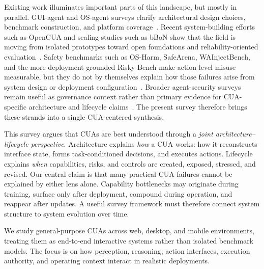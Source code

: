 Existing work illuminates important parts of this landscape, but mostly in parallel. GUI-agent and OS-agent surveys clarify architectural design choices, benchmark construction, and platform coverage~\cite{nguyen2025gui,hu2025agents,tang2025survey}. Recent system-building efforts such as OpenCUA and scaling studies such as bBoN show that the field is moving from isolated prototypes toward open foundations and reliability-oriented evaluation~\cite{wang2025opencua,gonzalez2025scalingcua}. Safety benchmarks such as OS-Harm, SafeArena, WAInjectBench, and the more deployment-grounded Risky-Bench make action-level misuse measurable, but they do not by themselves explain how those failures arise from system design or deployment configuration~\cite{kuntz2025harm,tur2025safearena,liu2025wainjectbench,zheng2026riskybench}. Broader agent-security surveys remain useful as governance context rather than primary evidence for CUA-specific architecture and lifecycle claims~\cite{adapala2025aegis,lazer2026survey}. The present survey therefore brings these strands into a single CUA-centered synthesis.

This survey argues that CUAs are best understood through a \emph{joint architecture--lifecycle perspective}. Architecture explains \emph{how} a CUA works: how it reconstructs interface state, forms task-conditioned decisions, and executes actions. Lifecycle explains \emph{when} capabilities, risks, and controls are created, exposed, stressed, and revised. Our central claim is that many practical CUA failures cannot be explained by either lens alone. Capability bottlenecks may originate during training, surface only after deployment, compound during operation, and reappear after updates. A useful survey framework must therefore connect system structure to system evolution over time.

We study general-purpose CUAs across web, desktop, and mobile environments, treating them as end-to-end interactive systems rather than isolated benchmark models. The focus is on how perception, reasoning, action interfaces, execution authority, and operating context interact in realistic deployments.

